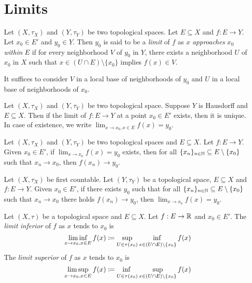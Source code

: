 \documentclass[screen]{techreport}
\numberwithin{equation}{section}
\begin{document}
\section{Limits}

\begin{definition}\label{De:Limits}
	Let $(X,\tau_X)$ and $(Y,\tau_Y)$ be two topological spaces.
	Let $E \subseteq X$ and $f: E \to Y$.
	Let $x_0 \in E'$ and $y_0 \in Y$.
	Then $y_0$ is said to be a \emph{limit} of $f$ as $x$ \emph{approaches} $x_0$ \emph{within} $E$ if for every neighborhood $V$ of $y_0$ in $Y$, there exists a neighborhood $U$ of $x_0$ in $X$ such that
	$x \in (U \cap E) \setminus \{x_0\}$ implies $f(x) \in V$.
\end{definition}

\begin{remark}\label{Rem:LimitsConsiderLocalbase}
	It suffices to consider $V$ in a local base of neighborhoods of $y_0$ and $U$ in a local base of neighborhoods of $x_0$.
\end{remark}

\begin{proposition}\label{Prop:LimitIntoT2AtMostOne}
	Let $(X,\tau_X)$ and $(Y,\tau_Y)$ be two topological space.
	Suppose $Y$ is Hausdorff and $E \subseteq X$.
	Then if the limit of $f : E \to Y$ at a point $x_0 \in E'$ exists, then it is unique.
	In case of existence, we write $\lim_{x \to x_0, x \in E} f(x) = y_0$.
\end{proposition}

\begin{proposition}\label{Prop:LimitImlySeqConv}
	Let $(X,\tau_X)$ and $(Y,\tau_Y)$ be two topological spaces and $E \subseteq X$.
	Let $f : E \to Y$.
	Given $x_0 \in E'$, if $\lim_{x \to x_0} f(x) = y_0$ exists, then for all $\{x_n\}_{n \in \mathbb{N}} \subseteq E \setminus \{x_0\}$ such that $x_n \rightarrow x_0$, then $f(x_n) \rightarrow y_0$.
\end{proposition}

\begin{proposition}\label{Prop:LimitFromFstCountExistIfSeqConv}
	Let $(X,\tau_X)$ be first countable.
	Let $(Y,\tau_Y)$ be a topological space, $E \subseteq X$ and $f: E \to Y$.
	Given $x_0 \in E'$, if there exists $y_0$ such that for all $\{x_n\}_{n \in \mathbb{N}} \subseteq E \setminus \{x_0\}$ such that $x_n \rightarrow x_0$ there holds $f(x_n) \rightarrow y_0$, then $\lim_{x \to x_0} f(x) = y_0$.
\end{proposition}

\begin{definition}\label{De:LimitInfAndSup}
	Let $(X,\tau)$ be a topological space and $E \subseteq X$.
	Let $f : E \to \mathbb{R}$ and $x_0 \in E'$.
	The \emph{limit inferior} of $f$ as $x$ tends to $x_0$ is
	\[
 	\liminf_{x \to x_0, x \in E} f(x) \coloneqq \adjustlimits \sup_{U \in \tau(x_0)} \inf_{x \in (U \cap E) \setminus \{x_0\}} f(x)
	\]
	The \emph{limit superior} of $f$ as $x$ tends to $x_0$ is
	\[
	\limsup_{x \to x_0, x \in E} f(x) \coloneqq \adjustlimits \inf_{U \in \tau(x_0)} \sup_{x \in (U \cap E) \setminus \{x_0\}} f(x)
	\]
\end{definition}
\end{document}

